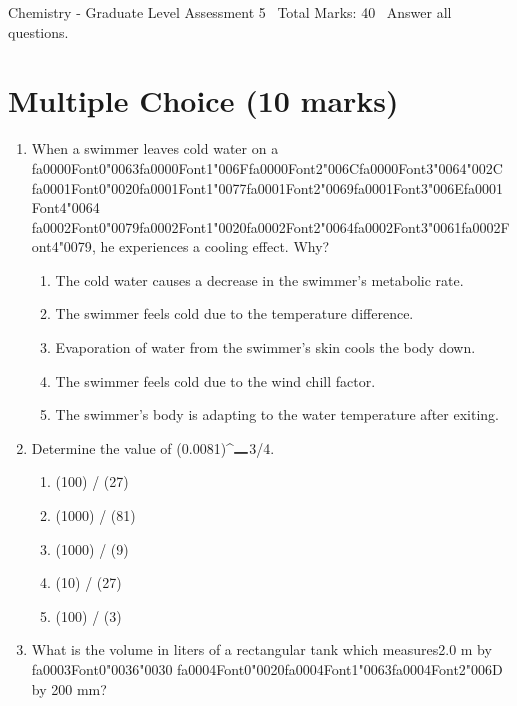 \documentclass[12pt]{article}
\begin{document}
\begin{center}
Chemistry - Graduate Level Assessment 5 \
Total Marks: 40 \
Answer all questions.
\end{center}

\section*{Multiple Choice (10 marks)}
\begin{enumerate}[label=\arabic*.]
\item When a swimmer leaves cold water on a {\csname fa0000Font0\endcsname\char"0063}{\csname fa0000Font1\endcsname\char"006F}{\csname fa0000Font2\endcsname\char"006C}{\csname fa0000Font3\endcsname\char"0064}{\char"002C} {\csname fa0001Font0\endcsname\char"0020}{\csname fa0001Font1\endcsname\char"0077}{\csname fa0001Font2\endcsname\char"0069}{\csname fa0001Font3\endcsname\char"006E}{\csname fa0001Font4\endcsname\char"0064} {\csname fa0002Font0\endcsname\char"0079}{\csname fa0002Font1\endcsname\char"0020}{\csname fa0002Font2\endcsname\char"0064}{\csname fa0002Font3\endcsname\char"0061}{\csname fa0002Font4\endcsname\char"0079}, he experiences a cooling effect.
Why?
\begin{enumerate}[label=(\alph*)]
    \item The cold water causes a decrease in the swimmer's metabolic rate.
    \item The swimmer feels cold due to the temperature difference.
    \item Evaporation of water from the swimmer's skin cools the body down.
    \item The swimmer feels cold due to the wind chill factor.
    \item The swimmer's body is adapting to the water temperature after exiting.
\end{enumerate}
\item Determine the value of (0.0081)\^{}\ensuremath{\rule{1em}{1pt}}3/4.
\begin{enumerate}[label=(\alph*)]
    \item (100) / (27)
    \item (1000) / (81)
    \item (1000) / (9)
    \item (10) / (27)
    \item (100) / (3)
\end{enumerate}
\item What is the volume in liters of a rectangular tank which measures2.0 m by {\csname fa0003Font0\endcsname\char"0036}{\char"0030} {\csname fa0004Font0\endcsname\char"0020}{\csname fa0004Font1\endcsname\char"0063}{\csname fa0004Font2\endcsname\char"006D} by 200 mm?

\end{enumerate}
\end{document}
